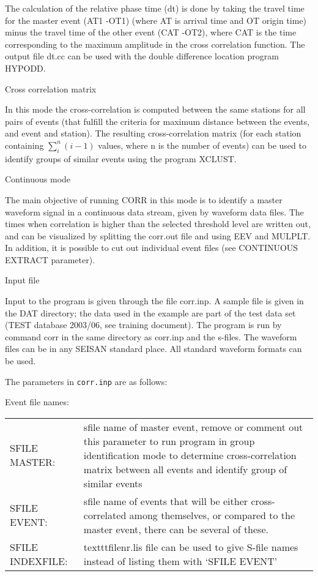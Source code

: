 The calculation of the relative phase time (dt) is done by taking 
the travel time for the master event (AT1 -OT1) (where AT is arrival time and OT origin time) minus the travel time of the other event (CAT -OT2), where CAT is the time corresponding to the maximum amplitude in the cross correlation function. The output file dt.cc can be used with the double difference location program HYPODD.  

Cross correlation matrix

In this mode the cross-correlation is computed between the same stations for all pairs of events (that fulfill the criteria for maximum distance between the events, and event and station). The resulting 
cross-correlation matrix (for each station containing $\sum_{i}^{n}(i-1)$ values, where n is the number of 
events) can be used to identify groups of similar events using the program XCLUST.  

Continuous mode 

The main objective of running CORR in this mode is to identify a master waveform signal in a continuous data stream, given by waveform data files. The times when correlation is higher than the selected threshold level are written out, and can be visualized by splitting the corr.out file and using EEV and MULPLT. In addition, it is possible to cut out individual event files (see CONTINUOUS EXTRACT parameter). 

Input file 

Input to the program is given through the file corr.inp. A sample file is given in the DAT directory; the data used in the example are part of the test data set (TEST database 2003/06, see training document). The program is run by command corr in the same directory as corr.inp and the s-files. The waveform files can be in any SEISAN standard place. All standard waveform formats can be used. 

The parameters in \texttt{corr.inp} are as follows:

Event file names: 

\begin{tabular}{lp{11.0cm}}
SFILE MASTER: & sfile name of master event, remove or comment out this parameter 
                to run program in group identification mode to determine 
                cross-correlation matrix between all events and identify group of similar events \\
SFILE EVENT:  & sfile name of events that will be either cross-correlated among themselves, or 
                compared to the master event, there can be several of these. \\
SFILE INDEXFILE: & texttt{filenr.lis} file can be used to give S-file names instead of listing 
                   them with `SFILE EVENT' \\
\end{tabular}

